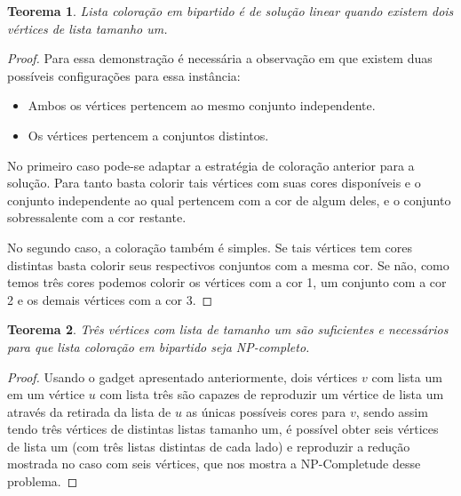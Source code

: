 \documentclass[9pt, compress]{beamer}
\newtheorem{teorema}{Teorema}
\begin{document}
       \begin{frame}
       \begin{teorema}
       Lista coloração em bipartido é de solução linear quando existem dois vértices de lista tamanho um.
       \end{teorema}
       \begin{proof}
        Para essa demonstração é necessária a observação em que existem duas possíveis configurações para essa instância:
        \begin{itemize}
          \item Ambos os vértices pertencem ao mesmo conjunto independente.
          \item Os vértices pertencem a conjuntos distintos.
        \end{itemize} 
        No primeiro caso pode-se adaptar a estratégia de coloração anterior para a solução. Para tanto basta colorir tais vértices com suas cores disponíveis e o conjunto independente ao qual pertencem com a cor de algum deles, e o conjunto sobressalente com a cor restante.
 
        No segundo caso, a coloração também é simples. Se tais vértices tem cores distintas basta colorir seus respectivos conjuntos com a mesma cor. Se não, como temos três cores podemos colorir os vértices com a cor 1, um conjunto com a cor 2 e os demais vértices com a cor 3.
       \end{proof}
     \end{frame}
     \begin{frame}
       \begin{teorema}
         Três vértices com lista de tamanho um são suficientes e necessários para que lista coloração em bipartido seja NP-completo.
       \end{teorema}
       \begin{proof}
        Usando o gadget apresentado anteriormente, dois vértices $v$ com lista um em um vértice $u$ com lista três são capazes de reproduzir um vértice de lista um através da retirada da lista de $u$ as únicas possíveis cores para $v$, sendo assim tendo três vértices de distintas listas tamanho um, é possível obter seis vértices de lista um (com três listas distintas de cada lado) e reproduzir a redução mostrada no caso com seis vértices, que nos mostra a NP-Completude desse problema.
       \end{proof}
     \end{frame}
\end{document}
